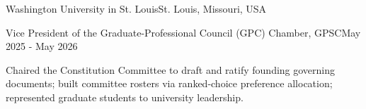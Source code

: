 \documentclass[10pt, letterpaper]{article}
\begin{document}
\vspace{\entrySpacing}
\begin{leadershipentry}{Washington University in St. Louis}{St. Louis, Missouri, USA}
	\begin{positionentry}{Vice President of the Graduate-Professional Council (GPC) Chamber, GPSC}{May 2025 - May 2026}
		\item Chaired the Constitution Committee to draft and ratify founding governing documents; built committee rosters via ranked-choice preference allocation; represented graduate students to university leadership.
	\end{positionentry}
\end{leadershipentry}

\end{document}
